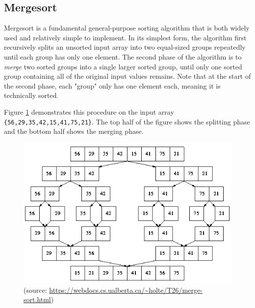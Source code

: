 \documentclass{article}
\theoremstyle{definition}
\begin{document}
\subsection{Mergesort}

Mergesort is a fundamental general-purpose sorting algorithm that is both widely used and relatively simple to implement. In its simplest form, the algorithm first recursively splits an unsorted input array into two equal-sized groups repeatedly until each group has only one element. The second phase of the algorithm is to \emph{merge} two sorted groups into a single larger sorted group, until only one sorted group containing all of the original input values remains. Note that at the start of the second phase, each "group" only has one element each, meaning it is technically sorted. 

Figure \ref{figure/mergesort} demonstrates this procedure on the input array\\ \texttt{\{56,29,35,42,15,41,75,21\}}. The top half of the figure shows the splitting phase and the bottom half shows the merging phase.

\begin{figure}[h!]
    \includegraphics[width=\textwidth]{images/mergesort.png}
    \caption{(source: \url{https://webdocs.cs.ualberta.ca/~holte/T26/merge-sort.html})}
    \label{figure/mergesort}
\end{figure}
\end{document}
